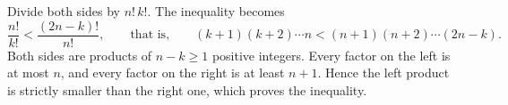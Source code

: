 Divide both sides by $n!\,k!$. The inequality becomes
\[\dfrac{n!}{k!}<\dfrac{(2n-k)!}{n!},\qquad\text{that is,}\qquad (k+1)(k+2)\cdots n<(n+1)(n+2)\cdots(2n-k).\]
Both sides are products of $n-k\ge1$ positive integers. Every factor on the left is at most $n$, and every factor on the right is at least $n+1$. Hence the left product is strictly smaller than the right one, which proves the inequality.
